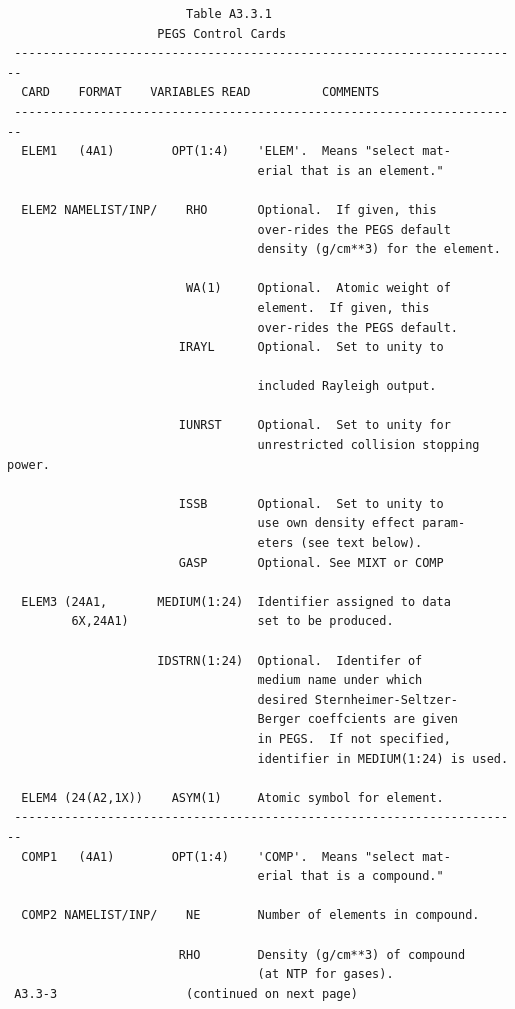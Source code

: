 \newpage {} \begin{verbatim}
                         Table A3.3.1
                     PEGS Control Cards
 -----------------------------------------------------------------------
  CARD    FORMAT    VARIABLES READ          COMMENTS
 -----------------------------------------------------------------------
  ELEM1   (4A1)        OPT(1:4)    'ELEM'.  Means "select mat-
                                   erial that is an element."
 
  ELEM2 NAMELIST/INP/    RHO       Optional.  If given, this
                                   over-rides the PEGS default
                                   density (g/cm**3) for the element.
 
                         WA(1)     Optional.  Atomic weight of
                                   element.  If given, this
                                   over-rides the PEGS default.
                        IRAYL      Optional.  Set to unity to

                                   included Rayleigh output.
 
                        IUNRST     Optional.  Set to unity for
                                   unrestricted collision stopping power.
 
                        ISSB       Optional.  Set to unity to
                                   use own density effect param-
                                   eters (see text below).
                        GASP       Optional. See MIXT or COMP
 
  ELEM3 (24A1,       MEDIUM(1:24)  Identifier assigned to data
         6X,24A1)                  set to be produced.
 
                     IDSTRN(1:24)  Optional.  Identifer of
                                   medium name under which
                                   desired Sternheimer-Seltzer-
                                   Berger coeffcients are given
                                   in PEGS.  If not specified,
                                   identifier in MEDIUM(1:24) is used.
 
  ELEM4 (24(A2,1X))    ASYM(1)     Atomic symbol for element.
 -----------------------------------------------------------------------
  COMP1   (4A1)        OPT(1:4)    'COMP'.  Means "select mat-
                                   erial that is a compound."
 
  COMP2 NAMELIST/INP/    NE        Number of elements in compound.
 
                        RHO        Density (g/cm**3) of compound
                                   (at NTP for gases).
 A3.3-3                  (continued on next page)
\end{verbatim} 
